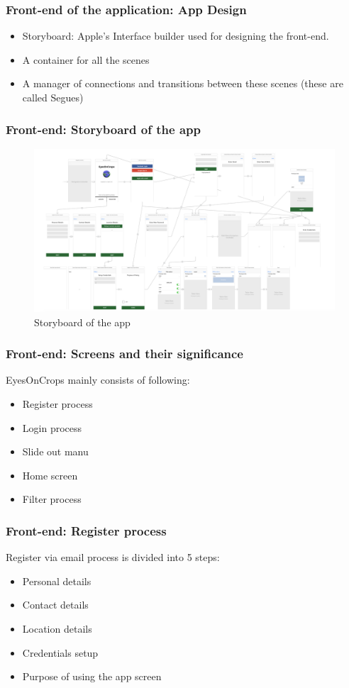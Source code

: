 \begin{frame}
\frametitle{Front-end of the application: App Design}
 \begin{itemize}
    \item Storyboard: Apple's Interface builder used for designing the front-end. 
    \item A container for all the scenes
    \item A manager of connections and transitions between these scenes (these are called Segues)
\end{itemize}
\end{frame}

\begin{frame}
\frametitle{Front-end: Storyboard of the app}
 \begin{figure}[H]
            \centering
            \includegraphics[width=0.95\linewidth]{final/figures/storyboard_final.png}
            \caption{Storyboard of the app}
    \end{figure}
\end{frame}

\begin{frame}
\frametitle{Front-end: Screens and their significance}
EyesOnCrops mainly consists of following:

\begin{itemize}
    \item Register process
    \item Login process
    \item Slide out manu
    \item Home screen
    \item Filter process
\end{itemize}

\end{frame}

\begin{frame}
\frametitle{Front-end: Register process}

    Register via email process is divided into 5 steps:
    
    \begin{itemize}
        \item Personal details
        \item Contact details
        \item Location details
        \item Credentials setup
        \item Purpose of using the app screen
    \end{itemize}
\end{frame}

